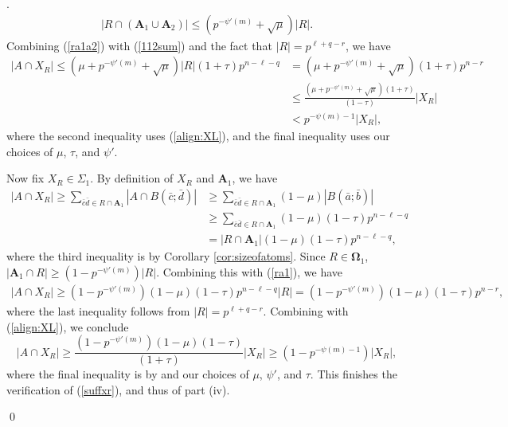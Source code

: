 \documentclass[12pt,oneside,british,a4wide]{amsart}
\numberwithin{equation}{section}
\theoremstyle{definition}
\newcommand{\abar}{\bar{a}}
\newcommand{\bbar}{\bar{b}}
\newcommand{\cbar}{\bar{c}}
\newcommand{\dbar}{\bar{d}}
\newenvironment{proofof}[1]{\indent{\itshape Proof of #1}.\;}{\qed}
\begin{document}
\begin{proofof}{Theorem \ref{thm:fop}}
\begin{align}\label{ra1a2}
|R\cap (\mathbf{A}_1\cup \mathbf{A}_2)|\leq (p^{-\psi'(m)}+\sqrt{\mu})|R|.
\end{align}
Combining (\ref{ra1a2}) with (\ref{112sum}) and the fact that $|R|=p^{\ell+q-r}$, we have 
\begin{align*}
|A\cap X_{R}|\leq (\mu+p^{-\psi'(m)}+\sqrt{\mu})|R|(1+\tau)p^{n-\ell-q}&= (\mu+p^{-\psi'(m)}+\sqrt{\mu})(1+\tau)p^{n-r}\\
&\leq \frac{(\mu+p^{-\psi'(m)}+\sqrt{\mu})(1+\tau)}{(1-\tau)}|X_R|\\
&<p^{-\psi(m)-1}|X_R|,
\end{align*}
where the second inequality uses (\ref{align:XL}), and the final inequality uses our choices of $\mu$, $\tau$, and $\psi'$. 


Now fix $X_R\in \Sigma_1$.   By definition of $X_R$ and $\mathbf{A}_1$, we have
\begin{align}\label{ra1}
\nonumber|A\cap X_{R}|\geq \sum_{\cbar\dbar\in R\cap \mathbf{A}_1}|A\cap B(\cbar;\dbar)|&\geq  \sum_{\cbar\dbar\in R\cap \mathbf{A}_1}(1- \mu)|B(\abar;\bbar)|\\
\nonumber&\geq \sum_{\cbar\dbar\in R\cap \mathbf{A}_1}(1- \mu)(1-\tau)p^{n-\ell-q}\\
&=|R\cap \mathbf{A}_1|(1- \mu)(1-\tau)p^{n-\ell-q},
\end{align}
where the third inequality is by Corollary \ref{cor:sizeofatoms}.   Since $R\in \mathbf{\Omega}_1$, $|\mathbf{A}_1\cap R|\geq (1-p^{-\psi'(m)})|R|$.  Combining this with (\ref{ra1}), we have
\begin{align*}
|A\cap X_R|\geq (1- p^{-\psi'(m)})(1-\mu)(1-\tau)p^{n-\ell-q}|R|=(1- p^{-\psi'(m)})(1-\mu)(1-\tau)p^{n-r},
\end{align*}
where the last inequality follows from $|R|=p^{\ell+q-r}$.  Combining with (\ref{align:XL}), we conclude
$$
|A\cap X_R|\geq \frac{(1- p^{-\psi'(m)})(1-\mu)(1-\tau)}{(1+\tau)}|X_R|\geq (1-p^{-\psi(m)-1})|X_R|,
$$
where the final inequality is by and our choices of $\mu$, $\psi'$, and $\tau$. This finishes the verification of (\ref{suffxr}), and thus of part (iv).    


\end{proofof}
\end{document}
